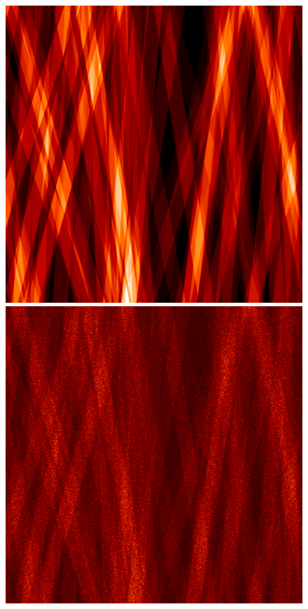 \documentclass[tocnosub,noragright,centerchapter,12pt]{uiucecethesis09}
\begin{document}
\begin{figure}[h]
  \centering
  \begin{minipage}{.3\textwidth}
    \centering
    \includegraphics[width=1\textwidth]{figures/strands_truth.png}
  \end{minipage}
  \begin{minipage}{.3\textwidth}
    \centering
    \includegraphics[width=1\textwidth]{figures/strands_frame.png}

\end{minipage}
\end{figure}
\end{document}

